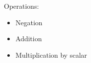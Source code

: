 Operations:
\begin{itemize}
  \item Negation
  \item Addition
  \item Multiplication by scalar
\end{itemize}
